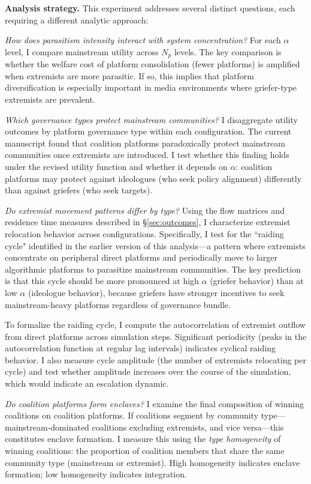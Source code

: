 \documentclass[12pt]{article}
\begin{document}
\textbf{Analysis strategy.} This experiment addresses several distinct questions, each requiring a different analytic approach:

\textit{How does parasitism intensity interact with system concentration?} For each $\alpha$ level, I compare mainstream utility across $N_p$ levels. The key comparison is whether the welfare cost of platform consolidation (fewer platforms) is amplified when extremists are more parasitic. If so, this implies that platform diversification is especially important in media environments where griefer-type extremists are prevalent.

\textit{Which governance types protect mainstream communities?} I disaggregate utility outcomes by platform governance type within each configuration. The current manuscript found that coalition platforms paradoxically protect mainstream communities once extremists are introduced. I test whether this finding holds under the revised utility function and whether it depends on $\alpha$: coalition platforms may protect against ideologues (who seek policy alignment) differently than against griefers (who seek targets).

\textit{Do extremist movement patterns differ by type?} Using the flow matrices and residence time measures described in \S\ref{sec:outcomes}, I characterize extremist relocation behavior across configurations. Specifically, I test for the ``raiding cycle" identified in the earlier version of this analysis---a pattern where extremists concentrate on peripheral direct platforms and periodically move to larger algorithmic platforms to parasitize mainstream communities. The key prediction is that this cycle should be more pronounced at high $\alpha$ (griefer behavior) than at low $\alpha$ (ideologue behavior), because griefers have stronger incentives to seek mainstream-heavy platforms regardless of governance bundle.

To formalize the raiding cycle, I compute the autocorrelation of extremist outflow from direct platforms across simulation steps. Significant periodicity (peaks in the autocorrelation function at regular lag intervals) indicates cyclical raiding behavior. I also measure cycle amplitude (the number of extremists relocating per cycle) and test whether amplitude increases over the course of the simulation, which would indicate an escalation dynamic.

\textit{Do coalition platforms form enclaves?} I examine the final composition of winning coalitions on coalition platforms. If coalitions segment by community type---mainstream-dominated coalitions excluding extremists, and vice versa---this constitutes enclave formation. I measure this using the \textit{type homogeneity} of winning coalitions: the proportion of coalition members that share the same community type (mainstream or extremist). High homogeneity indicates enclave formation; low homogeneity indicates integration.
\end{document}
